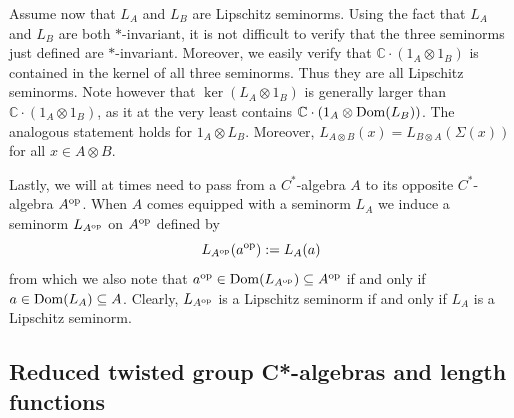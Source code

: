 \documentclass[11pt, a4paper, oneside, final, reqno]{amsart}
\newcommand{\bbC}{\mathbb{C}}
\theoremstyle{definition}
\theoremstyle{plain}
\theoremstyle{remark}
\numberwithin{equation}{section}
\begin{document}
Assume now that $L_A$ and $L_B$ are Lipschitz seminorms. Using the fact that $L_A$ and $L_B$ are both $*$-invariant, it is not difficult to verify that the three seminorms just defined are $*$-invariant. Moreover, we easily verify that $\bbC \cdot (1_A \otimes 1_B)$ is contained in the kernel of all three seminorms. Thus they are all Lipschitz seminorms. Note however that $\ker (L_A \otimes 1_B)$ is generally larger than $\bbC \cdot (1_A \otimes 1_B)$, as it at the very least contains $\bbC \cdot (1_A \otimes {\rm Dom}(L_B))$. The analogous statement holds for $1_A\otimes L_B$. Moreover, $L_{A \otimes B}(x) = L_{B \otimes A}(\Sigma (x))$ for all $x \in A \otimes B$.

Lastly, we will at times need to pass from a $C^*$-algebra $A$ to its opposite $C^*$-algebra $A^{\rm op}$. When $A$ comes equipped with a seminorm $L_A$ we induce a seminorm $L_{A^{\rm op}}$ on $A^{\rm op}$ defined by
\begin{equation}\label{eq:def-opposite-seminorm}
    L_{A^{\rm op}} (a^{\rm op}) := L_A (a)
\end{equation}
from which we also note that $a^{\rm op} \in {\rm Dom}(L_{A^{\rm op}})\subseteq A^{\rm op}$ if and only if $a \in {\rm Dom}(L_A) \subseteq A$.
Clearly, $L_{A^{\rm op}}$ is a Lipschitz seminorm if and only if $L_A$ is a Lipschitz seminorm.

\subsection{Reduced twisted group C*-algebras and length functions}\label{twisted}
\end{document}
